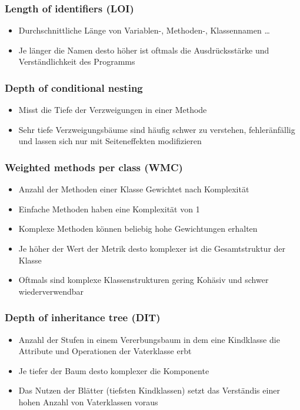 \begin{frame}[fragile]
	\frametitle{Length of identifiers (LOI)}
		\begin{itemize}
		  \item Durchschnittliche Länge von Variablen-, Methoden-, Klassennamen \ldots
			\item Je länger die Namen desto höher ist oftmals die Ausdrücksstärke und Verständlichkeit
						des Programms
		\end{itemize}
\end{frame}

\begin{frame}[fragile]
	\frametitle{Depth of conditional nesting}
		\begin{itemize}
		  \item Misst die Tiefe der Verzweigungen in einer Methode
			\item Sehr tiefe Verzweigungsbäume sind häufig schwer zu verstehen, fehleränfällig
						und lassen sich nur mit Seiteneffekten modifizieren
		\end{itemize}
\end{frame}

\begin{frame}[fragile]
	\frametitle{Weighted methods per class (WMC)}
		\begin{itemize}
		  \item Anzahl der Methoden einer Klasse Gewichtet nach Komplexität
			\item Einfache Methoden haben eine Komplexität von 1
			\item Komplexe Methoden können beliebig hohe Gewichtungen erhalten
			\item Je höher der Wert der Metrik desto komplexer ist die Gesamtstruktur der Klasse
			\item Oftmals sind komplexe Klassenstrukturen gering Kohäsiv und schwer wiederverwendbar
		\end{itemize}
\end{frame}

\begin{frame}[fragile]
	\frametitle{Depth of inheritance tree (DIT)}
		\begin{itemize}
		  \item Anzahl der Stufen in einem Vererbungsbaum in dem eine Kindklasse die Attribute und Operationen
						der Vaterklasse erbt
			\item Je tiefer der Baum desto komplexer die Komponente
			\item Das Nutzen der Blätter (tiefsten Kindklassen) setzt das Verständis einer hohen Anzahl von Vaterklassen voraus
		\end{itemize}
\end{frame}

